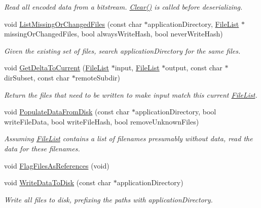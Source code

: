 \begin{DoxyCompactItemize}
\begin{DoxyCompactList}\small\item\em Read all encoded data from a bitstream. \hyperlink{class_rak_net_1_1_file_list_a0aaff64575ef83bf998d88cd8c5bd60e}{Clear()} is called before deserializing. \end{DoxyCompactList}\item 
void \hyperlink{class_rak_net_1_1_file_list_aea9ffda23dd33149eaee6920658bf563}{List\-Missing\-Or\-Changed\-Files} (const char $\ast$application\-Directory, \hyperlink{class_rak_net_1_1_file_list}{File\-List} $\ast$missing\-Or\-Changed\-Files, bool always\-Write\-Hash, bool never\-Write\-Hash)
\begin{DoxyCompactList}\small\item\em Given the existing set of files, search application\-Directory for the same files. \end{DoxyCompactList}\item 
void \hyperlink{class_rak_net_1_1_file_list_ac33f1a4ad0daec40c8aad00ccd7c45d2}{Get\-Delta\-To\-Current} (\hyperlink{class_rak_net_1_1_file_list}{File\-List} $\ast$input, \hyperlink{class_rak_net_1_1_file_list}{File\-List} $\ast$output, const char $\ast$dir\-Subset, const char $\ast$remote\-Subdir)
\begin{DoxyCompactList}\small\item\em Return the files that need to be written to make {\itshape input} match this current \hyperlink{class_rak_net_1_1_file_list}{File\-List}. \end{DoxyCompactList}\item 
void \hyperlink{class_rak_net_1_1_file_list_a128a186b55edc6e657dc30eac1504d68}{Populate\-Data\-From\-Disk} (const char $\ast$application\-Directory, bool write\-File\-Data, bool write\-File\-Hash, bool remove\-Unknown\-Files)
\begin{DoxyCompactList}\small\item\em Assuming \hyperlink{class_rak_net_1_1_file_list}{File\-List} contains a list of filenames presumably without data, read the data for these filenames. \end{DoxyCompactList}\item 
void \hyperlink{class_rak_net_1_1_file_list_aa8dd0df10e49eaf05a60fb915c66a211}{Flag\-Files\-As\-References} (void)
\item 
void \hyperlink{class_rak_net_1_1_file_list_aa98d01c5fcc631d6a8a55b2ec3c522d2}{Write\-Data\-To\-Disk} (const char $\ast$application\-Directory)
\begin{DoxyCompactList}\small\item\em Write all files to disk, prefixing the paths with application\-Directory. \end{DoxyCompactList}\item 

\end{DoxyCompactItemize}
